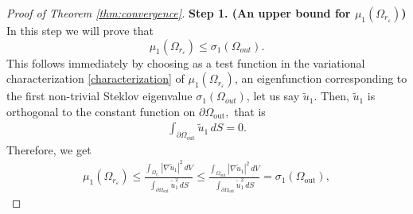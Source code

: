 \documentclass[12pt,reqno]{amsart}
\numberwithin{equation}{section}
\numberwithin{theorem}{section}
\numberwithin{equation}{section}
\numberwithin{theorem}{section}
\begin{document}
\begin{proof}[Proof of Theorem \ref{thm:convergence}]
\textbf{Step 1. (An upper bound for $\mu_1(\Omega_{r_\varepsilon})$)} In this step we will prove that
\begin{equation}\label{eq:uppbound}
    \mu_1(\Omega_{r_\varepsilon})\le \sigma_1(\Omega_{out}).
\end{equation}
   This follows immediately by choosing as a test function in the variational characterization \eqref{characterization} of $\mu_1(\Omega_{r_\varepsilon})$, an eigenfunction corresponding to the first non-trivial Steklov eigenvalue $\sigma_1(\Omega_{out})$, let us say $\tilde{u}_1$. Then, $\tilde{u}_1$ is orthogonal to the constant function on $\partial \Omega_{\mathrm{out}},$ that is
   \begin{align*}
       \int_{\partial \Omega_{\mathrm{out}}} \tilde{u}_1 \, dS =0.
   \end{align*}
    Therefore, we get 
    \begin{align*}
        \mu_1(\Omega_{r_{\varepsilon}})\leq \frac{\displaystyle \int_{\Omega_{r_{\varepsilon}}} |\nabla \tilde{u}_1|^2 \, dV}{\displaystyle\int_{\partial \Omega_{\mathrm{out}}}\tilde{u}_1^2 \,dS}\le\frac{\displaystyle\int_{\Omega_{\mathrm{out}}} |\nabla \tilde{u}_1|^2 \, dV}{\displaystyle\int_{\partial\Omega_{\mathrm{out}}}\tilde{u}_1^2\, dS} =\sigma_1(\Omega_{\mathrm{out}}),
    \end{align*}


\end{proof}
\end{document}
